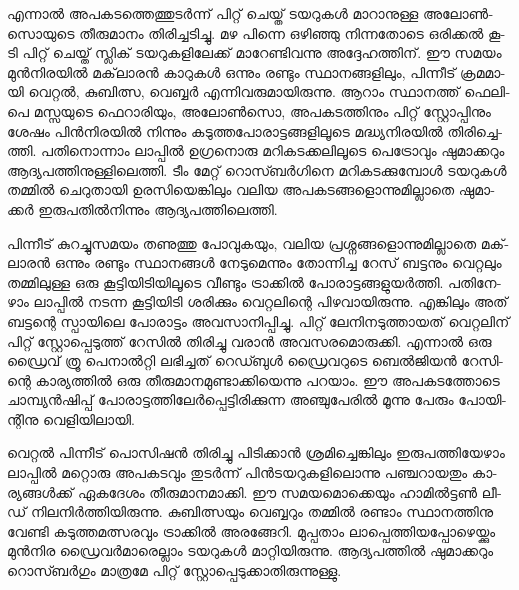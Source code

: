 എ­ന്നാല്‍ അപ­ക­ട­ത്തെ­ത്തു­ടര്‍­ന്ന് പി­റ്റ് ചെ­യ്ത് ടയ­റു­കള്‍ മാ­റാ­നു­ള്ള അലോണ്‍­സൊ­യു­ടെ തീ­രു­മാ­നം തി­രി­ച്ച­ടി­ച്ചു. മഴ 
പി­ന്നെ ഒഴി­ഞ്ഞു നി­ന്ന­തോ­ടെ ഒരി­ക്കല്‍ കൂ­ടി പി­റ്റ് ചെ­യ്ത് സ്ലി­ക് ടയ­റു­ക­ളി­ലേ­ക്ക് മാ­റേ­ണ്ടി­വ­ന്നു അദ്ദേ­ഹ­ത്തി­ന്. ഈ 
സമ­യം മുന്‍­നി­ര­യില്‍ മക്‌­ലാ­രന്‍ കാ­റു­കള്‍ ഒന്നും രണ്ടും സ്ഥാ­ന­ങ്ങ­ളി­ലും, പി­ന്നീ­ട് ക്ര­മ­മാ­യി വെ­റ്റല്‍, കു­ബി­ത്സ, 
വെ­ബ്ബര്‍ എന്നി­വ­രു­മാ­യി­രു­ന്നു. ആറാം സ്ഥാ­ന­ത്ത് ഫെ­ലി­പെ മസ്സ­യു­ടെ ഫെ­റാ­രി­യും, അലോണ്‍­സൊ, അപ­ക­ട­ത്തി­നും 
പി­റ്റ് സ്റ്റോ­പ്പി­നും ശേ­ഷം പിന്‍­നി­ര­യില്‍ നി­ന്നും കടു­ത്ത­പോ­രാ­ട്ട­ങ്ങ­ളി­ലൂ­ടെ മദ്ധ്യ­നി­ര­യില്‍ തി­രി­ച്ചെ­ത്തി. പതി­നൊ­ന്നാം 
ലാ­പ്പില്‍ ഉഗ്ര­നൊ­രു മറി­ക­ട­ക്ക­ലി­ലൂ­ടെ പെ­ട്രോ­വും ഷു­മാ­ക്ക­റും ആദ്യ­പ­ത്തി­നു­ള്ളി­ലെ­ത്തി. ടീം മേ­റ്റ് റൊ­സ്ബര്‍­ഗി­നെ 
മറി­ക­ട­ക്കു­മ്പോള്‍ ടയ­റു­കള്‍ തമ്മില്‍ ചെ­റു­താ­യി ഉര­സി­യെ­ങ്കി­ലും വലിയ അപ­ക­ട­ങ്ങ­ളൊ­ന്നു­മി­ല്ലാ­തെ ഷു­മാ­ക്കര്‍ 
ഇരു­പ­തില്‍­നി­ന്നും ആദ്യ­പ­ത്തി­ലെ­ത്തി­.

­പി­ന്നീ­ട് കു­റ­ച്ചു­സ­മ­യം തണു­ത്തു പോ­വു­ക­യും, വലിയ പ്ര­ശ്ന­ങ്ങ­ളൊ­ന്നു­മി­ല്ലാ­തെ മക്‌­ലാ­രന്‍ ഒന്നും രണ്ടും സ്ഥാ­ന­ങ്ങള്‍ 
നേ­ടു­മെ­ന്നും തോ­ന്നി­ച്ച റേ­സ് ബട്ട­നും വെ­റ്റ­ലും തമ്മി­ലു­ള്ള ഒരു കൂ­ട്ടി­യി­ടി­യി­ലൂ­ടെ വീ­ണ്ടും ട്രാ­ക്കില്‍ പോ­രാ­ട്ട­ങ്ങ­ളു­യര്‍­ത്തി. 
പതി­നേ­ഴാം ലാ­പ്പില്‍ നട­ന്ന കൂ­ട്ടി­യി­ടി ശരി­ക്കും വെ­റ്റ­ലി­ന്റെ പി­ഴ­വാ­യി­രു­ന്നു. എങ്കി­ലും അത് ബട്ട­ന്റെ സ്പാ­യി­ലെ പോ­രാ­ട്ടം 
അവ­സാ­നി­പ്പി­ച്ചു. പി­റ്റ് ലേ­നി­ന­ടു­ത്താ­യ­ത് വെ­റ്റ­ലി­ന് പി­റ്റ് സ്റ്റോ­പ്പെ­ടു­ത്ത് റേ­സില്‍ തി­രി­ച്ചു വരാന്‍ അവ­സ­ര­മൊ­രു­ക്കി. 
എന്നാല്‍ ഒരു ഡ്രൈ­വ് ത്രൂ പെ­നാല്‍­റ്റി ലഭി­ച്ച­ത് ­റെ­ഡ്ബുള്‍ ഡ്രൈ­വ­റു­ടെ ബെല്‍­ജി­യന്‍ റേ­സി­ന്റെ കാ­ര്യ­ത്തില്‍ ഒരു 
തീ­രു­മാ­ന­മു­ണ്ടാ­ക്കി­യെ­ന്നു പറ­യാം. ഈ അപ­ക­ട­ത്തോ­ടെ ചാ­മ്പ്യന്‍­ഷി­പ്പ് പോ­രാ­ട്ട­ത്തി­ലേര്‍­പ്പെ­ട്ടി­രി­ക്കു­ന്ന അഞ്ചു­പേ­രില്‍ 
മൂ­ന്നു പേ­രും പോ­യി­ന്റി­നു വെ­ളി­യി­ലാ­യി­.

­വെ­റ്റല്‍ പി­ന്നീ­ട് പൊ­സി­ഷന്‍ തി­രി­ച്ചു പി­ടി­ക്കാന്‍ ശ്ര­മി­ച്ചെ­ങ്കി­ലും ഇരു­പ­ത്തി­യേ­ഴാം ലാ­പ്പില്‍ മറ്റൊ­രു അപ­ക­ട­വും തു­ടര്‍­ന്ന് 
പിന്‍­ട­യ­റു­ക­ളി­ലൊ­ന്നു പഞ്ച­റാ­യ­തും കാ­ര്യ­ങ്ങള്‍­ക്ക് ഏക­ദേ­ശം തീ­രു­മാ­ന­മാ­ക്കി. ഈ സമ­യ­മൊ­ക്കെ­യും ഹാ­മില്‍­ട്ടണ്‍ ലീ­ഡ് 
നി­ല­നിര്‍­ത്തി­യി­രു­ന്നു. കു­ബി­ത്സ­യും വെ­ബ്ബ­റും തമ്മില്‍ രണ്ടാം സ്ഥാ­ന­ത്തി­നു വേ­ണ്ടി കടു­ത്ത­മ­ത്സ­ര­വും ട്രാ­ക്കില്‍ അര­ങ്ങേ­റി. 
മു­പ്പ­താം ലാ­പ്പെ­ത്തി­യ­പ്പോ­ഴെ­യ്ക്കും മുന്‍­നിര ഡ്രൈ­വര്‍­മാ­രെ­ല്ലാം ടയ­റു­കള്‍ മാ­റ്റി­യി­രു­ന്നു. ആദ്യ­പ­ത്തില്‍ ഷു­മാ­ക്ക­റും 
റൊ­സ്ബര്‍­ഗും മാ­ത്ര­മേ പി­റ്റ് സ്റ്റോ­പ്പെ­ടു­ക്കാ­തി­രു­ന്നു­ള്ളു­.


